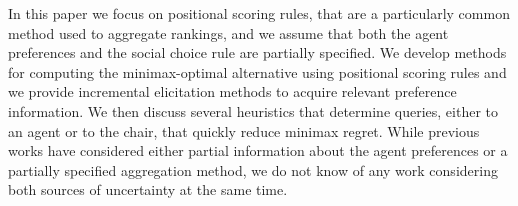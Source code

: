 \documentclass[sigconf, anonymous]{aamas}
\begin{document}
In this paper we focus on positional scoring rules, that are a particularly common method used to aggregate rankings, and we assume that both the agent preferences and the social choice rule are partially specified. We develop methods for computing the minimax-optimal
alternative using positional scoring rules and we provide incremental elicitation methods to acquire relevant preference information. We then discuss several heuristics that determine queries, either to an agent or to the chair, that quickly reduce minimax regret. While previous works have considered either partial information about the agent preferences or a partially specified aggregation method, we do not know of any work considering both sources of uncertainty at the same time.


\end{document}
